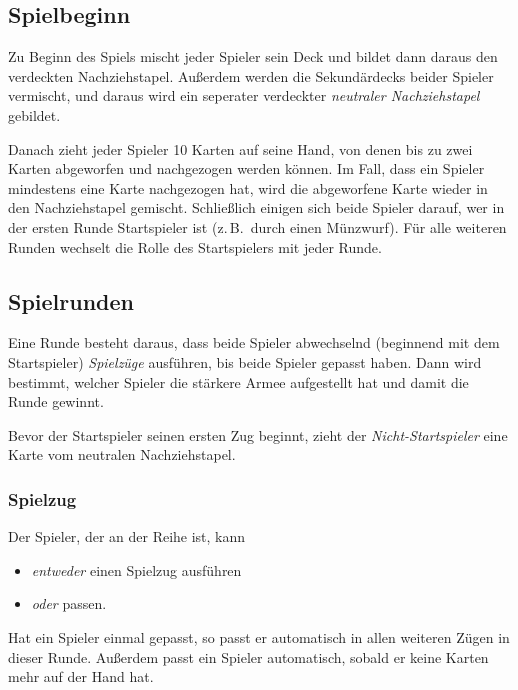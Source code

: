 \documentclass[a4paper,11pt]{report}
\begin{document}
\subsection{Spielbeginn}
Zu Beginn des Spiels mischt jeder Spieler sein Deck und bildet dann daraus den verdeckten Nachziehstapel. Außerdem werden die Sekundärdecks beider Spieler vermischt, und daraus wird ein seperater verdeckter \emph{neutraler Nachziehstapel} gebildet.

Danach zieht jeder Spieler 10 Karten auf seine Hand, von denen bis zu zwei Karten abgeworfen und nachgezogen werden können. Im Fall, dass ein Spieler mindestens eine Karte nachgezogen hat, wird die abgeworfene Karte wieder in den Nachziehstapel gemischt. Schließlich einigen sich beide Spieler darauf, wer in der ersten Runde Startspieler ist (z.\,B.\ durch einen Münzwurf). Für alle weiteren Runden wechselt die Rolle des Startspielers mit jeder Runde.

\subsection{Spielrunden}
Eine Runde besteht daraus, dass beide Spieler abwechselnd (beginnend mit dem Startspieler) \emph{Spielzüge} ausführen, bis beide Spieler gepasst haben. Dann wird bestimmt, welcher Spieler die stärkere Armee aufgestellt hat und damit die Runde gewinnt.

Bevor der Startspieler seinen ersten Zug beginnt, zieht der \emph{Nicht-Startspieler} eine Karte vom neutralen Nachziehstapel.

\subsubsection{Spielzug}
Der Spieler, der an der Reihe ist, kann
\begin{itemize}
	\item \emph{entweder} einen Spielzug ausführen
	\item \emph{oder} passen.
\end{itemize}
Hat ein Spieler einmal gepasst, so passt er automatisch in allen weiteren Zügen in dieser Runde. Außerdem passt ein Spieler automatisch, sobald er keine Karten mehr auf der Hand hat.
\end{document}
